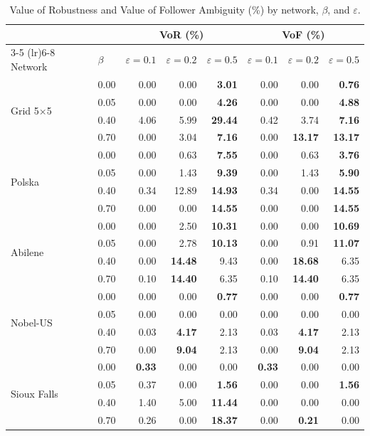 \begin{table}[htbp]
\centering
\caption{Value of Robustness and Value of Follower Ambiguity (\%) by network, $\beta$, and $\varepsilon$.}
\label{tab:vor_vof}
\small
\begin{tabular}{ll rrr rrr}
\toprule
 & & \multicolumn{3}{c}{VoR (\%)} & \multicolumn{3}{c}{VoF (\%)} \\
\cmidrule(lr){3-5} \cmidrule(lr){6-8}
Network & $\beta$ & $\varepsilon\!=\!0.1$ & $\varepsilon\!=\!0.2$ & $\varepsilon\!=\!0.5$ & $\varepsilon\!=\!0.1$ & $\varepsilon\!=\!0.2$ & $\varepsilon\!=\!0.5$ \\
\midrule
 \multirow{4}{*}{Grid 5$\times$5} & 0.00 & 0.00 & 0.00 & \textbf{3.01} & 0.00 & 0.00 & \textbf{0.76} \\
  & 0.05 & 0.00 & 0.00 & \textbf{4.26} & 0.00 & 0.00 & \textbf{4.88} \\
  & 0.40 & 4.06 & 5.99 & \textbf{29.44} & 0.42 & 3.74 & \textbf{7.16} \\
  & 0.70 & 0.00 & 3.04 & \textbf{7.16} & 0.00 & \textbf{13.17} & \textbf{13.17} \\
\midrule
 \multirow{4}{*}{Polska} & 0.00 & 0.00 & 0.63 & \textbf{7.55} & 0.00 & 0.63 & \textbf{3.76} \\
  & 0.05 & 0.00 & 1.43 & \textbf{9.39} & 0.00 & 1.43 & \textbf{5.90} \\
  & 0.40 & 0.34 & 12.89 & \textbf{14.93} & 0.34 & 0.00 & \textbf{14.55} \\
  & 0.70 & 0.00 & 0.00 & \textbf{14.55} & 0.00 & 0.00 & \textbf{14.55} \\
\midrule
 \multirow{4}{*}{Abilene} & 0.00 & 0.00 & 2.50 & \textbf{10.31} & 0.00 & 0.00 & \textbf{10.69} \\
  & 0.05 & 0.00 & 2.78 & \textbf{10.13} & 0.00 & 0.91 & \textbf{11.07} \\
  & 0.40 & 0.00 & \textbf{14.48} & 9.43 & 0.00 & \textbf{18.68} & 6.35 \\
  & 0.70 & 0.10 & \textbf{14.40} & 6.35 & 0.10 & \textbf{14.40} & 6.35 \\
\midrule
 \multirow{4}{*}{Nobel-US} & 0.00 & 0.00 & 0.00 & \textbf{0.77} & 0.00 & 0.00 & \textbf{0.77} \\
  & 0.05 & 0.00 & 0.00 & 0.00 & 0.00 & 0.00 & 0.00 \\
  & 0.40 & 0.03 & \textbf{4.17} & 2.13 & 0.03 & \textbf{4.17} & 2.13 \\
  & 0.70 & 0.00 & \textbf{9.04} & 2.13 & 0.00 & \textbf{9.04} & 2.13 \\
\midrule
 \multirow{4}{*}{Sioux Falls} & 0.00 & \textbf{0.33} & 0.00 & 0.00 & \textbf{0.33} & 0.00 & 0.00 \\
  & 0.05 & 0.37 & 0.00 & \textbf{1.56} & 0.00 & 0.00 & \textbf{1.56} \\
  & 0.40 & 1.40 & 5.00 & \textbf{11.44} & 0.00 & 0.00 & 0.00 \\
  & 0.70 & 0.26 & 0.00 & \textbf{18.37} & 0.00 & \textbf{0.21} & 0.00 \\
\bottomrule
\end{tabular}
\end{table}